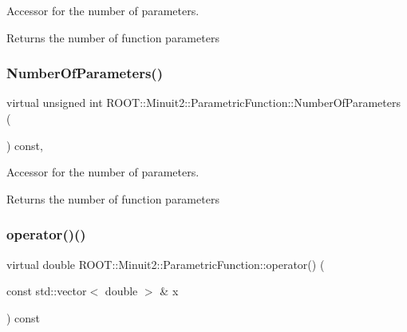 Accessor for the number of parameters.

\begin{DoxyReturn}{Returns}
the number of function parameters 
\end{DoxyReturn}
\mbox{\label{classROOT_1_1Minuit2_1_1ParametricFunction_a8e5e21de5e8f6e5bedd1ae7ea27b24ac}} 
\subsubsection{\texorpdfstring{NumberOfParameters()}{NumberOfParameters()}\hspace{0.1cm}{\footnotesize\ttfamily [2/2]}}
{\footnotesize\ttfamily virtual unsigned int R\+O\+O\+T\+::\+Minuit2\+::\+Parametric\+Function\+::\+Number\+Of\+Parameters (\begin{DoxyParamCaption}{ }\end{DoxyParamCaption}) const\hspace{0.3cm}{\ttfamily [inline]}, {\ttfamily [virtual]}}

Accessor for the number of parameters.

\begin{DoxyReturn}{Returns}
the number of function parameters 
\end{DoxyReturn}
\mbox{\label{classROOT_1_1Minuit2_1_1ParametricFunction_a953426fa51c84cdef3eba24274131806}} 
\subsubsection{\texorpdfstring{operator()()}{operator()()}\hspace{0.1cm}{\footnotesize\ttfamily [1/4]}}
{\footnotesize\ttfamily virtual double R\+O\+O\+T\+::\+Minuit2\+::\+Parametric\+Function\+::operator() (\begin{DoxyParamCaption}\item[{const std\+::vector$<$ double $>$ \&}]{x }\end{DoxyParamCaption}) const\hspace{0.3cm}{\ttfamily [pure virtual]}}

